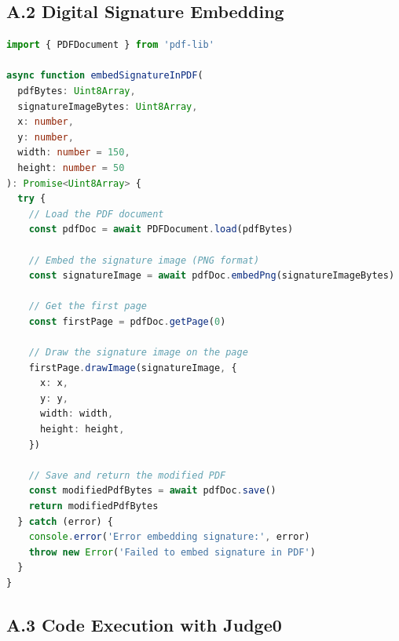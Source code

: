 \subsection{A.2 Digital Signature Embedding}

\begin{lstlisting}[language=TypeScript, caption=PDF Signature Embedding]
import { PDFDocument } from 'pdf-lib'

async function embedSignatureInPDF(
  pdfBytes: Uint8Array,
  signatureImageBytes: Uint8Array,
  x: number,
  y: number,
  width: number = 150,
  height: number = 50
): Promise<Uint8Array> {
  try {
    // Load the PDF document
    const pdfDoc = await PDFDocument.load(pdfBytes)
    
    // Embed the signature image (PNG format)
    const signatureImage = await pdfDoc.embedPng(signatureImageBytes)
    
    // Get the first page
    const firstPage = pdfDoc.getPage(0)
    
    // Draw the signature image on the page
    firstPage.drawImage(signatureImage, {
      x: x,
      y: y,
      width: width,
      height: height,
    })
    
    // Save and return the modified PDF
    const modifiedPdfBytes = await pdfDoc.save()
    return modifiedPdfBytes
  } catch (error) {
    console.error('Error embedding signature:', error)
    throw new Error('Failed to embed signature in PDF')
  }
}
\end{lstlisting}

\subsection{A.3 Code Execution with Judge0}

